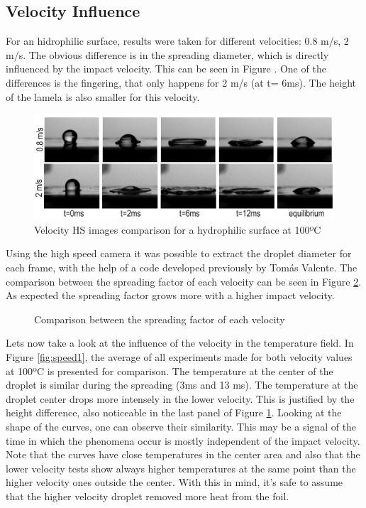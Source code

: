 \subsection{Velocity Influence}

\par For an hidrophilic surface, results were taken for different velocities: 0.8 m/s, 2 m/s. The obvious difference is in the spreading diameter, which is directly influenced by the impact velocity. This can be seen in Figure \label{fig:irvshr}. One of the differences is the fingering, that only happens for 2 m/s (at t= 6ms). The height of the lamela is also smaller for this velocity.

\begin{figure}[h]
\centering
\includegraphics[width=1\linewidth]{Figures/5.Chapter/hsspeed.png}
\caption{Velocity HS images comparison for a hydrophilic surface at 100ºC}
\label{fig:irvshr}
\end{figure}


\par Using the high speed camera it was possible to extract the droplet diameter for each frame, with the help of a code developed previously by Tomás Valente. The comparison between the spreading factor of each velocity can be seen in Figure \ref{fig:diameter}. As expected the spreading factor grows more with a higher impact velocity.

\begin{figure}[h]
\centering

\caption{Comparison between the spreading factor of each velocity}
\label{fig:diameter}
\end{figure}

\par Lets now take a look at the influence of the velocity in the temperature field. In Figure \ref{fig:speed1}, the average of all experiments made for both velocity values at 100ºC is presented for comparison. The temperature at the center of the droplet is similar during the spreading (3ms and 13 ms). The temperature at the droplet center drops more intensely in the lower velocity. This is justified by the height difference, also noticeable in the last panel of Figure \ref{fig:irvshr}. Looking at the shape of the curves, one can observe their similarity. This may be a signal of the time in which the phenomena occur is mostly independent of the impact velocity. Note that the curves have close temperatures in the center area and also that the lower velocity tests show always higher temperatures at the same point than the higher velocity ones outside the center. With this in mind, it's safe to assume that the higher velocity droplet removed more heat from the foil.

